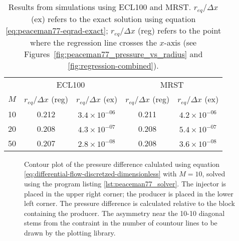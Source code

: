 \begin{table}[htbp]
\centering
    \caption{Results from simulations using ECL100 and MRST. $r_{eq}/\Delta x$ (ex) refers to the exact solution using equation \eqref{eq:peaceman77-eqrad-exact}; $r_{eq} / \Delta x$ (reg) refers to the point where the regression line crosses the $x$-axis (see Figures~\ref{fig:peaceman77_pressure_vs_radius} and \ref{fig:regression-combined}).}
    \begin{tabular}{c|cc|cc}
        \toprule
            & \multicolumn{2}{c|}{ECL100} & \multicolumn{2}{c}{MRST} \\
        $M$ &  $r_{eq}/\Delta x$ (reg) & $r_{eq}/\Delta x$ (ex) & $r_{eq}/\Delta x$ (reg) & $r_{eq}/\Delta x$ (ex) \\
        \midrule
        10  & 0.212 & $3.4\times 10^{-06}$  &  0.211 & $4.2\times 10^{-06}$ \\
        20  & 0.208 & $4.3\times 10^{-07}$  &  0.208 & $5.4\times 10^{-07}$ \\
        50  & 0.207 & $2.8\times 10^{-08}$  &  0.208 & $3.6\times 10^{-08}$ \\
        \bottomrule
    \end{tabular}
    \label{tbl:simulation-results}
\end{table}

\begin{figure}[htbp]
    \centering
    \scalebox{0.7}{}
    \caption{Contour plot of the pressure difference calulated using equation \eqref{eq:differential-flow-discretzed-dimensionless} with $M=10$, solved using the program listing \ref{lst:peaceman77_solver}. The injector is placed in the upper right corner; the producer is placed in the lower left corner. The pressure difference is calculated relative to the block containing the producer. The asymmetry near the 10-10 diagonal stems from the contraint in the number of countour lines to be drawn by the plotting library.}
    \label{fig:pressure_drop_contour}
\end{figure}


